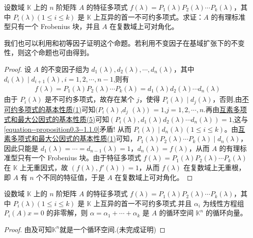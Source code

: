 \documentclass[../../main.tex]{subfiles}
\begin{document}
\begin{proposition}\label{proposition:特征多项式在数域K上的不可约分解则在复数域上可对角化}
设数域 $\mathbb{K}$ 上的 $n$ 阶矩阵 $A$ 的特征多项式 $f(\lambda)=P_1(\lambda)P_2(\lambda)\cdots P_k(\lambda)$，其中 $P_i(\lambda) (1\leqslant  i\leqslant  k)$ 是 $\mathbb{K}$ 上互异的首一不可约多项式。求证：$A$ 的有理标准型只有一个 Frobenius 块，并且 $A$ 在复数域上可对角化。
\end{proposition}
\begin{remark}
我们也可以利用和初等因子证明这个命题。若利用不变因子在基域扩张下的不变性，则这个命题也可由得到。
\end{remark}
\begin{proof}
设 $A$ 的不变因子组为 $d_1(\lambda),d_2(\lambda),\cdots,d_n(\lambda)$，其中$d_{i}(\lambda)\mid d_{i+1}(\lambda),i=1,2,\cdots,n-1$,则有
\begin{align}\label{equation--proposition0.3--1.1.0}
f(\lambda)=P_1(\lambda)P_2(\lambda)\cdots P_k(\lambda)=d_1(\lambda)d_2(\lambda)\cdots d_n(\lambda)
\end{align}
由于 $P_i(\lambda)$ 是不可约多项式，故存在某个 $j$，使得 $P_i(\lambda)\mid d_j(\lambda)$，否则,由\hyperref[proposition:不可约多项式的基本性质]{不可约多项式的基本性质(1)}可知$(P_i(\lambda)$,$d_j$ $(\lambda))$ $=1$,$j=1,2,\cdots,n$.再由\hyperref[proposition:互素多项式和最大公因式的基本性质]{互素多项式和最大公因式的基本性质(5)}可知$(P_i(\lambda),d_1(\lambda)d_2(\lambda)\cdots d_n(\lambda))=1$,这与\eqref{equation--proposition0.3--1.1.0}矛盾!
从而 $P_i(\lambda)\mid d_n(\lambda) (1\leqslant  i\leqslant  k)$。由\hyperref[proposition:互素多项式和最大公因式的基本性质]{互素多项式和最大公因式的基本性质(1)}可知，$P_1(\lambda)P_2(\lambda)\cdots P_k(\lambda)\mid d_n(\lambda)$，因此只能是 $d_1(\lambda)=\cdots = d_{n - 1}(\lambda)=1$，$d_n(\lambda)=f(\lambda)$，从而 $A$ 的有理标准型只有一个 Frobenius 块。由于特征多项式 $f(\lambda)=P_1(\lambda)P_2(\lambda)\cdots P_k(\lambda)$ 在 $\mathbb{K}$ 上无重因式，故 $(f(\lambda),f'(\lambda)) = 1$，从而 $f(\lambda)$ 在复数域上无重根，即 $A$ 有 $n$ 个不同的特征值，于是 $A$ 在复数域上可对角化。
\end{proof}

\begin{corollary}
设数域 $\mathbb{K}$ 上的 $n$ 阶矩阵 $A$ 的特征多项式 $f(\lambda)=P_1(\lambda)P_2(\lambda)\cdots P_k(\lambda)$，其中 $P_i(\lambda) (1\leqslant  i\leqslant  k)$ 是 $\mathbb{K}$ 上互异的首一不可约多项式.并且 $\alpha_i$ 为线性方程组 $P_i(A)x = 0$ 的非零解，则 $\alpha=\alpha_1 + \cdots + \alpha_k$ 是 $A$ 的循环空间 $\mathbb{K}^n$ 的循环向量。
\end{corollary}
\begin{proof}
由及可知$\mathbb{K}^n$就是一个循环空间.(未完成证明)
\end{proof}
\end{document}
